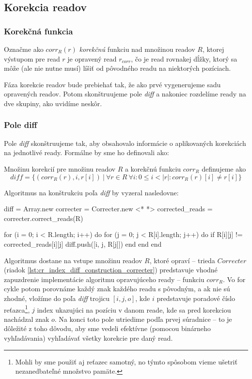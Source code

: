 \subsection{Korekcia readov}
\subsubsection{Korekčná funkcia}
\begin{ozn}
Označme ako $corr_R(r)$ \emph{korekčnú} funkciu nad množinou readov $R$, ktorej výstupom pre read $r$ je opravený read $r_{corr}$, čo je read rovnakej dĺžky, ktorý sa môže (ale nie nutne musí) líšiť od pôvodného readu na niektorých pozíciach.
\end{ozn}

Fáza korekcie readov bude prebiehať tak, že ako prvé vygenerujeme sadu opravených readov. Potom skonštruujeme pole \emph{diff} a nakoniec rozdelíme ready na dve skupiny, ako uvidíme neskôr.

\subsubsection{Pole diff}
Pole \emph{diff} skonštruujeme tak, aby obsahovalo informácie o aplikovaných korekciách na jednotlivé ready. Formálne by sme ho definovali ako:

\begin{defn}
Množinu korekcií pre množinu readov $R$ a korekčnú funkciu $corr_R$ definujeme ako 
$$
diff = \{(corr_R(r), i, r[i])~|~\forall r \in R~\forall i : 0 \leq i < |r| : corr_R(r)[i] \neq r[i] \}
$$
\end{defn}

Algoritmus na konštrukciu poľa \emph{diff} by vyzeral nasledovne:

\bigskip
\begin{pseudocode}[label=lst:cr_index_diff_construction,caption={Algoritmus konštrukcie poľa diff.}]
diff = Array.new
correcter = Correcter.new <* \label{lst:cr_index_diff_construction_correcter} *>
corrected_reads = correcter.correct_reads(R)

for (i = 0; i < R.length; i++) do
  for (j = 0; j < R[i].length; j++) do
    if R[i][j] != corrected_reads[i][j]
      diff.push([i, j, R[j]])
    end  
  end
end
\end{pseudocode}
\bigskip

Algoritmus dostane na vstupe množinu readov $R$, ktoré opraví -- trieda $Correcter$ (riadok \ref{lst:cr_index_diff_construction_correcter}) predstavuje vhodné zapuzdrenie implementácie algoritmu opravujúceho ready -- funkciu $corr_R$. Vo for cykle potom porovnáme každý znak každého readu s pôvodným, a ak nie sú zhodné, vložíme do poľa \emph{diff} trojicu $[i, j, o]$, kde $i$ predstavuje poradové číslo reťazca\footnote{Mohli by sme použiť aj reťazec samotný, no týmto spôsobom vieme ušetriť nezanedbateľné množstvo pamäte.}, $j$ index ukazujúci na pozíciu v danom reade, kde sa pred korekciou nachádzal znak $o$. Na konci toto pole utriedime podľa prvej súradnice -- to je dôležité z toho dôvodu, aby sme vedeli efektívne (pomocou binárneho vyhľadávania) vyhľadávať všetky korekcie pre daný read.

